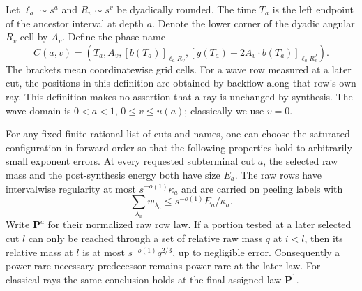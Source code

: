 Let $\ell_a\sim s^a$ and $R_v\sim s^v$ be dyadically rounded.
The time $T_a$ is the left endpoint of the ancestor interval at depth
$a$.  Denote the lower corner of the dyadic angular $R_v$-cell by
$A_v$.  Define the phase name
\begin{equation}
 C(a,v)=\left(T_a,A_v,
       [b(T_a)]_{\ell_aR_v},
       [y(T_a)-2A_v\cdot b(T_a)]_{\ell_aR_v^2}\right).
 \tag{grid}\label{eq:grid}
\end{equation}
The brackets mean coordinatewise grid cells.  For a wave row measured
at a later cut, the positions in this definition are obtained by
backflow along that row's own ray.  This definition makes no assertion
that a ray is unchanged by synthesis.  The wave domain is
$0<a<1$, $0\le v\le u(a)$; classically we use $v=0$.

\begin{lemma}\label{lem:rt-laws}
For any fixed finite rational list of cuts and names, one can choose
the saturated configuration in forward order so that the following
properties hold to arbitrarily small exponent errors.
At every requested subterminal cut $a$, the selected raw mass and
the post-synthesis energy both have size $E_a$.  The raw rows have
intervalwise regularity at most $s^{-o(1)}\kappa_a$ and are carried
on peeling labels with
\begin{equation}\label{eq:rt-weight-count}
 \sum_{\lambda_a}w_{\lambda_a}
       \le s^{-o(1)}E_a/\kappa_a.
\end{equation}
Write $\mathbf P^a$ for their normalized raw row law.  If a portion
tested at a later selected cut $l$ can only be reached through a set
of relative raw mass $q$ at $i<l$, then its relative mass at $l$ is
at most $s^{-o(1)}q^{2/3}$, up to negligible error.  Consequently a
power-rare necessary predecessor remains power-rare at the later
law.  For classical rays the same conclusion holds at the final
assigned law $\mathbf P^1$.
\end{lemma}


